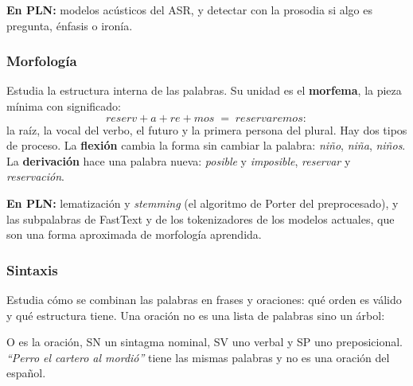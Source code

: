 \documentclass[11pt,letterpaper]{article}
\begin{document}
\textbf{En PLN:} modelos acústicos del ASR, y detectar con la
prosodia si algo es pregunta, énfasis o ironía.

\subsubsection*{Morfología}

Estudia la estructura interna de las palabras. Su unidad es el
\textbf{morfema}, la pieza mínima con significado:
\[
    \textit{reserv} + \textit{a} + \textit{re} + \textit{mos}
    \;=\; \textit{reservaremos} :
\]
la raíz, la vocal del verbo, el futuro y la primera persona del plural.
Hay dos tipos de proceso. La \textbf{flexión} cambia la forma sin
cambiar la palabra: \textit{niño}, \textit{niña}, \textit{niños}. La
\textbf{derivación} hace una palabra nueva: \textit{posible} y
\textit{imposible}, \textit{reservar} y \textit{reservación}.

\textbf{En PLN:} lematización y \textit{stemming} (el algoritmo de
Porter del preprocesado), y las subpalabras de FastText y de los
tokenizadores de los modelos actuales, que son una forma aproximada de
morfología aprendida.

\subsubsection*{Sintaxis}

Estudia cómo se combinan las palabras en frases y oraciones: qué orden
es válido y qué estructura tiene. Una oración no es una lista de
palabras sino un árbol:

\begin{center}
\end{center}

O es la oración, SN un sintagma nominal, SV uno verbal y SP uno
preposicional. \textit{``Perro el cartero al mordió''} tiene las mismas
palabras y no es una oración del español.
\end{document}
